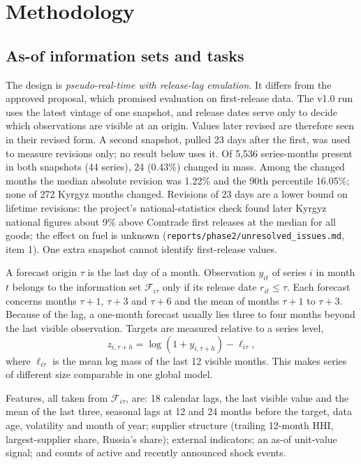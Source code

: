 \documentclass[conference]{IEEEtran}
\begin{document}
\section{Methodology}\label{sec:method}

\subsection{As-of information sets and tasks}
The design is \emph{pseudo-real-time with release-lag emulation}. It differs from the approved proposal, which promised evaluation on first-release data. The v1.0 run uses the latest vintage of one snapshot, and release dates serve only to decide which observations are visible at an origin. Values later revised are therefore seen in their revised form. A second snapshot, pulled 23 days after the first, was used to measure revisions only; no result below uses it. Of 5,536 series-months present in both snapshots (44 series), 24 (0.43\%) changed in mass. Among the changed months the median absolute revision was 1.22\% and the 90th percentile 16.05\%; none of 272 Kyrgyz months changed. Revisions of 23 days are a lower bound on lifetime revisions: the project's national-statistics check found later Kyrgyz national figures about 9\% above Comtrade first releases at the median for all goods; the effect on fuel is unknown (\texttt{reports/phase2/unresolved\_issues.md}, item 1). One extra snapshot cannot identify first-release values.

A forecast origin $\tau$ is the last day of a month. Observation $y_{it}$ of series $i$ in month $t$ belongs to the information set $\mathcal{F}_{i\tau}$ only if its release date $r_{it}\le\tau$. Each forecast concerns months $\tau+1$, $\tau+3$ and $\tau+6$ and the mean of months $\tau+1$ to $\tau+3$. Because of the lag, a one-month forecast usually lies three to four months beyond the last visible observation. Targets are measured relative to a series level,
\begin{equation}
z_{i,\tau+h}=\log(1+y_{i,\tau+h})-\ell_{i\tau},
\end{equation}
where $\ell_{i\tau}$ is the mean log mass of the last 12 visible months. This makes series of different size comparable in one global model.

Features, all taken from $\mathcal{F}_{i\tau}$, are: 18 calendar lags, the last visible value and the mean of the last three, seasonal lags at 12 and 24 months before the target, data age, volatility and month of year; supplier structure (trailing 12-month HHI, largest-supplier share, Russia's share); external indicators; an as-of unit-value signal; and counts of active and recently announced shock events.
\end{document}
